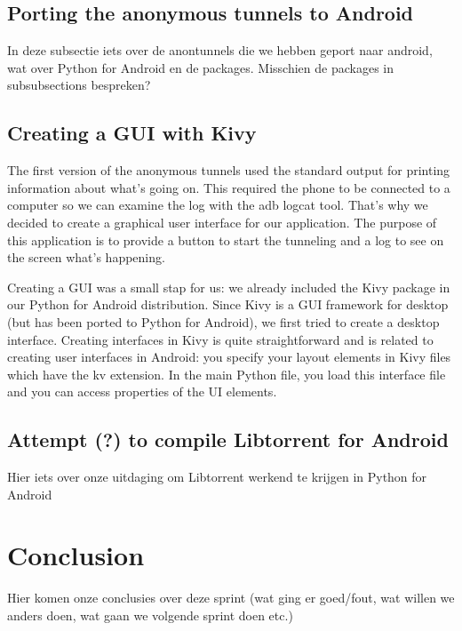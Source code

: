 \documentclass{article}
\begin{document}
\subsection{Porting the anonymous tunnels to Android}
	In deze subsectie iets over de anontunnels die we hebben geport naar android, wat over Python for Android en de packages. Misschien de packages in subsubsections bespreken?

\subsection{Creating a GUI with Kivy}
	The first version of the anonymous tunnels used the standard output for printing information about what’s going on. This required the phone to be connected to a computer so we can examine the log with the adb logcat tool. That’s why we decided to create a graphical user interface for our application. The purpose of this application is to provide a button to start the tunneling and a log to see on the screen what’s happening.

	Creating a GUI was a small stap for us: we already included the Kivy package in our Python for Android distribution. Since Kivy is a GUI framework for desktop (but has been ported to Python for Android), we first tried to create a desktop interface. Creating interfaces in Kivy is quite straightforward and is related to creating user interfaces in Android: you specify your layout elements in Kivy files which have the kv extension. In the main Python file, you load this interface file and you can access properties of the UI elements.

\subsection{Attempt (?) to compile Libtorrent for Android}
	Hier iets over onze uitdaging om Libtorrent werkend te krijgen in Python for Android

\section{Conclusion}
	Hier komen onze conclusies over deze sprint (wat ging er goed/fout, wat willen we anders doen, wat gaan we volgende sprint doen etc.)
\end{document}
